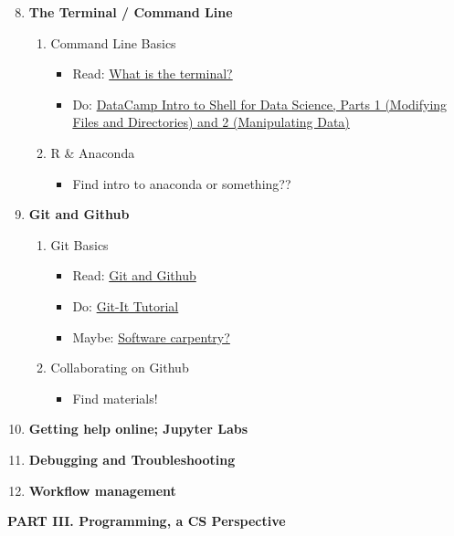 \documentclass[12pt]{article}
\begin{document}
\begin{enumerate}[label=\textbf{Week \arabic*:}]
	\setcounter{enumi}{7}
	\item \textbf{The Terminal / Command Line}
	\begin{enumerate}[label=Class \arabic*:]
		\item Command Line Basics
		\begin{itemize}
			\item Read: \href{https://www.programming4ds.com/html/terminal.html}{What is the terminal?}
			\item Do: \href{https://campus.datacamp.com/courses/introduction-to-shell-for-data-science/}{DataCamp Intro to Shell for Data Science, Parts 1 (Modifying Files and Directories) and 2 (Manipulating Data)}
		\end{itemize}
		\item R \& Anaconda
		\begin{itemize}
			\item Find intro to anaconda or something??
		\end{itemize}
	\end{enumerate}

	\item \textbf{Git and Github}
	\begin{enumerate}[label=Class \arabic*:]
		\item Git Basics
		\begin{itemize}
			\item Read: \href{https://www.programming4ds.com/html/git_and_github.html}{Git and Github}
			\item Do: \href{http://jlord.us/git-it/}{Git-It Tutorial}
			\item Maybe: \href{http://swcarpentry.github.io/git-novice/03-create/index.html}{Software carpentry?}
		\end{itemize}
		\item Collaborating on Github
		\begin{itemize}
			\item Find materials!
		\end{itemize}
	\end{enumerate}
	\item \textbf{Getting help online; Jupyter Labs}
	\item \textbf{Debugging and Troubleshooting}
	\item \textbf{Workflow management}
\end{enumerate}

\vspace{.4in}
\begin{center}
	\textbf{PART III. Programming, a CS Perspective}
\end{center}
\vspace{.2in}
\end{document}
